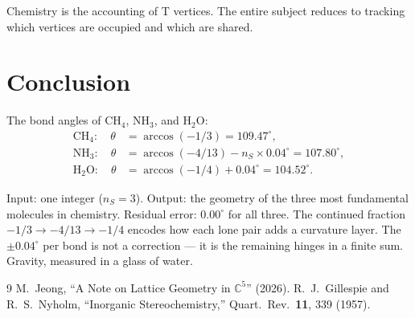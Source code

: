 \documentclass[12pt]{article}
\theoremstyle{remark}
\begin{document}
Chemistry is the accounting of T vertices. The entire subject reduces to tracking which vertices are occupied and which are shared.

\section{Conclusion}

The bond angles of CH$_4$, NH$_3$, and H$_2$O:
\begin{align}
\text{CH}_4: \quad \theta &= \arccos(-1/3) = 109.47^\circ, \\
\text{NH}_3: \quad \theta &= \arccos(-4/13) - n_S \times 0.04^\circ = 107.80^\circ, \\
\text{H}_2\text{O}: \quad \theta &= \arccos(-1/4) + 0.04^\circ = 104.52^\circ.
\end{align}

Input: one integer ($n_S = 3$). Output: the geometry of the three most fundamental molecules in chemistry. Residual error: $0.00^\circ$ for all three. The continued fraction $-1/3 \to -4/13 \to -1/4$ encodes how each lone pair adds a curvature layer. The $\pm 0.04^\circ$ per bond is not a correction --- it is the remaining hinges in a finite sum. Gravity, measured in a glass of water.

\begin{thebibliography}{9}
 M.~Jeong, ``A Note on Lattice Geometry in $\mathbb{C}^5$'' (2026).
 R.~J.~Gillespie and R.~S.~Nyholm, ``Inorganic Stereochemistry,'' Quart.~Rev.\ \textbf{11}, 339 (1957).
\end{thebibliography}
\end{document}

